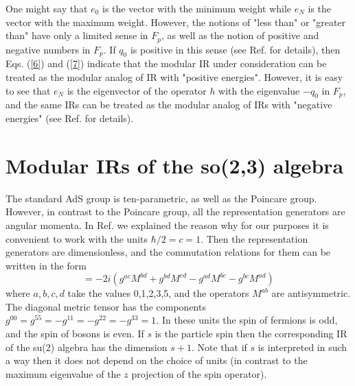 \documentclass[a4paper,12pt]{article}%
\begin{document}
One might say that $e_0$ is the vector with the
minimum weight while $e_N$ is the vector with the maximum weight.
However, the notions of "less than" or "greater than" have only
a limited sense in $F_p$, as well as the notion of positive
and negative numbers in $F_p$. If $q_0$ is positive in this sense
(see Ref. \cite{lev2} for details), then Eqs. (\ref{6}) and
(\ref{7}) indicate that the modular IR under consideration can be 
treated as the modular analog of IR with "positive energies".
However, it is easy to see that $e_N$ is the
eigenvector of the operator $h$ with the eigenvalue $-q_0$ in
$F_p$, and the same IRs can be treated as the modular analog
of IRs with "negative energies" (see Ref. \cite{lev2} for
details). 

\section{Modular IRs of the so(2,3) algebra}
\label{S3}

The standard AdS group
is ten-parametric, as well as the Poincare group. However, 
in contrast to the Poincare group, all the representation 
generators are angular momenta. In Ref. \cite{lev2} we 
explained the reason why for our
purposes it is convenient to work with the units 
$\hbar/2=c=1$. Then the representation generators are
dimensionless, and the commutation relations for them can be 
written in the form
\begin{equation}
[M^{ab},M^{cd}]=-2i (g^{ac}M^{bd}+g^{bd}M^{cd}-
g^{ad}M^{bc}-g^{bc}M^{ad})
\label{8}
\end{equation}
where $a,b,c,d$ take the values 0,1,2,3,5, and the operators 
$M^{ab}$ are antisymmetric. The diagonal metric tensor has the 
components $g^{00}=g^{55}=-g^{11}=-g^{22}=-g^{33}=1$.  
In these units the spin of fermions is odd, and the spin of 
bosons is even. If $s$ is the particle spin then the 
corresponding IR of the su(2) algebra has the dimension
$s+1$. Note that if $s$ is interpreted in such a way then it
does not depend on the choice of units (in contrast to the
maximum eigenvalue of the $z$ projection of the spin
operator).    
\end{document}
